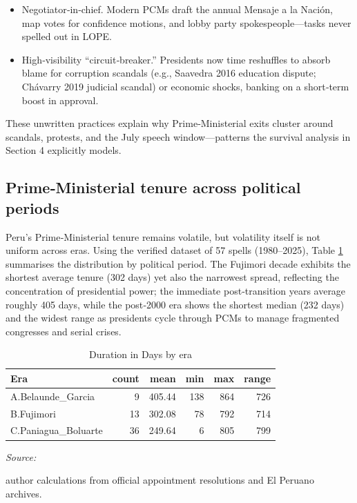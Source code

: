 \documentclass[a4paper, 12pt]{article}
\begin{document}
\begin{itemize}
\item Negotiator‑in‑chief. Modern PCMs draft the annual Mensaje a la Nación, map votes for confidence motions, and lobby party spokespeople—tasks never spelled out in LOPE.

\item High‑visibility “circuit‑breaker.” Presidents now time reshuffles to absorb blame for corruption scandals (e.g., Saavedra 2016 education dispute; Chávarry 2019 judicial scandal) or economic shocks, banking on a short‑term boost in approval.

\end{itemize}

These unwritten practices explain why Prime‑Ministerial exits cluster around scandals, protests, and the July speech window—patterns the survival analysis in Section 4 explicitly models.


\subsection{Prime‑Ministerial tenure across political periods}

Peru’s Prime‑Ministerial tenure remains volatile, but volatility itself is not uniform across eras.  Using the verified dataset of 57 spells (1980–2025), Table \ref{tab:durationPerEra} summarises the distribution by political period.  The Fujimori decade exhibits the shortest average tenure (302 days) yet also the narrowest spread, reflecting the concentration of presidential power; the immediate post‑transition years average roughly 405 days, while the post‑2000 era shows the shortest median (232 days) and the widest range as presidents cycle through PCMs to manage fragmented congresses and serial crises.



\begin{table}[!h]
\centering
\caption{Duration in Days by era\label{tab:durationPerEra}}
\centering
\begin{threeparttable}
\begin{tabular}[t]{lrrrrr}
\toprule
Era & count & mean & min & max & range\\
\midrule
A.Belaunde\_Garcia & 9 & 405.44 & 138 & 864 & 726\\
B.Fujimori & 13 & 302.08 & 78 & 792 & 714\\
C.Paniagua\_Boluarte & 36 & 249.64 & 6 & 805 & 799\\
\bottomrule
\end{tabular}
\begin{tablenotes}[para]
\item \textit{Source: } 
\item author calculations from official appointment resolutions and El Peruano archives.
\end{tablenotes}
\end{threeparttable}
\end{table}
\end{document}

